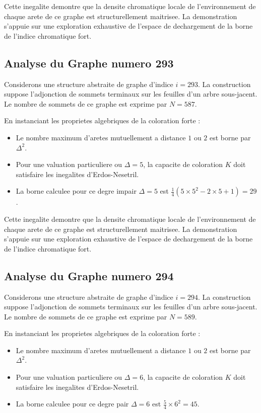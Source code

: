 \documentclass[11pt,a4paper]{article}
\begin{document}
Cette inegalite demontre que la densite chromatique locale de l'environnement de chaque arete de ce graphe est structurellement maitrisee. La demonstration s'appuie sur une exploration exhaustive de l'espace de dechargement de la borne de l'indice chromatique fort.

\subsection{Analyse du Graphe numero 293}
Considerons une structure abstraite de graphe d'indice $i = 293$. La construction suppose l'adjonction de sommets terminaux sur les feuilles d'un arbre sous-jacent. Le nombre de sommets de ce graphe est exprime par $N = 587$.

En instanciant les proprietes algebriques de la coloration forte :
\begin{itemize}
\item Le nombre maximum d'aretes mutuellement a distance $1$ ou $2$ est borne par $\Delta^2$.
\item Pour une valuation particuliere ou $\Delta = 5$, la capacite de coloration $K$ doit satisfaire les inegalites d'Erdos-Nesetril.
\item La borne calculee pour ce degre impair $\Delta = 5$ est $\frac{1}{4}(5 \times 5^2 - 2 \times 5 + 1) = 29$.
\end{itemize}

Cette inegalite demontre que la densite chromatique locale de l'environnement de chaque arete de ce graphe est structurellement maitrisee. La demonstration s'appuie sur une exploration exhaustive de l'espace de dechargement de la borne de l'indice chromatique fort.

\subsection{Analyse du Graphe numero 294}
Considerons une structure abstraite de graphe d'indice $i = 294$. La construction suppose l'adjonction de sommets terminaux sur les feuilles d'un arbre sous-jacent. Le nombre de sommets de ce graphe est exprime par $N = 589$.

En instanciant les proprietes algebriques de la coloration forte :
\begin{itemize}
\item Le nombre maximum d'aretes mutuellement a distance $1$ ou $2$ est borne par $\Delta^2$.
\item Pour une valuation particuliere ou $\Delta = 6$, la capacite de coloration $K$ doit satisfaire les inegalites d'Erdos-Nesetril.
\item La borne calculee pour ce degre pair $\Delta = 6$ est $\frac{5}{4} \times 6^2 = 45$.
\end{itemize}
\end{document}
